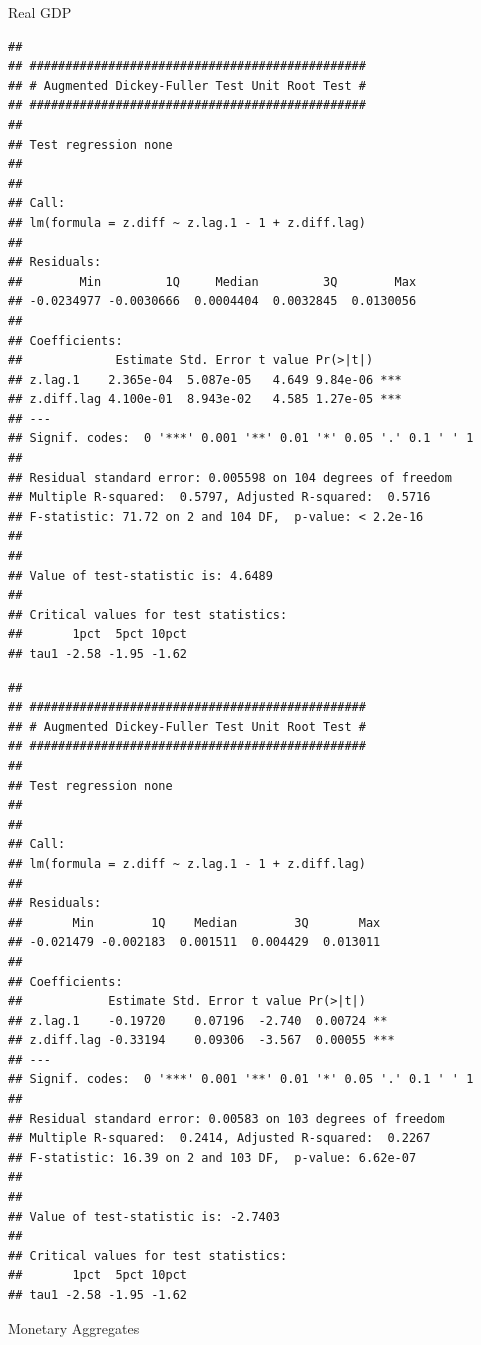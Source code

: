 \documentclass[11pt,preprint, authoryear]{elsarticle}
\numberwithin{equation}{section}
\numberwithin{figure}{section}
\numberwithin{table}{section}
\begin{document}
Real GDP

\begin{verbatim}
## 
## ############################################### 
## # Augmented Dickey-Fuller Test Unit Root Test # 
## ############################################### 
## 
## Test regression none 
## 
## 
## Call:
## lm(formula = z.diff ~ z.lag.1 - 1 + z.diff.lag)
## 
## Residuals:
##        Min         1Q     Median         3Q        Max 
## -0.0234977 -0.0030666  0.0004404  0.0032845  0.0130056 
## 
## Coefficients:
##             Estimate Std. Error t value Pr(>|t|)    
## z.lag.1    2.365e-04  5.087e-05   4.649 9.84e-06 ***
## z.diff.lag 4.100e-01  8.943e-02   4.585 1.27e-05 ***
## ---
## Signif. codes:  0 '***' 0.001 '**' 0.01 '*' 0.05 '.' 0.1 ' ' 1
## 
## Residual standard error: 0.005598 on 104 degrees of freedom
## Multiple R-squared:  0.5797, Adjusted R-squared:  0.5716 
## F-statistic: 71.72 on 2 and 104 DF,  p-value: < 2.2e-16
## 
## 
## Value of test-statistic is: 4.6489 
## 
## Critical values for test statistics: 
##       1pct  5pct 10pct
## tau1 -2.58 -1.95 -1.62
\end{verbatim}

\begin{verbatim}
## 
## ############################################### 
## # Augmented Dickey-Fuller Test Unit Root Test # 
## ############################################### 
## 
## Test regression none 
## 
## 
## Call:
## lm(formula = z.diff ~ z.lag.1 - 1 + z.diff.lag)
## 
## Residuals:
##       Min        1Q    Median        3Q       Max 
## -0.021479 -0.002183  0.001511  0.004429  0.013011 
## 
## Coefficients:
##            Estimate Std. Error t value Pr(>|t|)    
## z.lag.1    -0.19720    0.07196  -2.740  0.00724 ** 
## z.diff.lag -0.33194    0.09306  -3.567  0.00055 ***
## ---
## Signif. codes:  0 '***' 0.001 '**' 0.01 '*' 0.05 '.' 0.1 ' ' 1
## 
## Residual standard error: 0.00583 on 103 degrees of freedom
## Multiple R-squared:  0.2414, Adjusted R-squared:  0.2267 
## F-statistic: 16.39 on 2 and 103 DF,  p-value: 6.62e-07
## 
## 
## Value of test-statistic is: -2.7403 
## 
## Critical values for test statistics: 
##       1pct  5pct 10pct
## tau1 -2.58 -1.95 -1.62
\end{verbatim}

Monetary Aggregates
\end{document}
